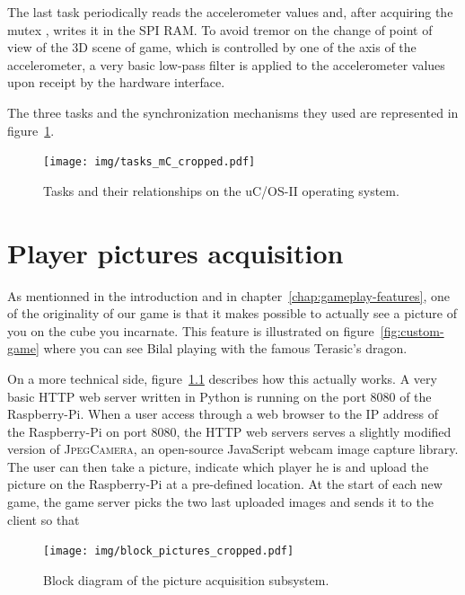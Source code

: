\documentclass[english, DIV=13]{scrreprt}
\begin{document}
The last task periodically reads the accelerometer values and, after acquiring
the mutex , writes it in the SPI RAM. To avoid tremor on the change of point of
view of the 3D scene of game, which is controlled by one of the axis of the
accelerometer, a very basic low-pass filter is applied to the accelerometer
values upon receipt by the hardware interface.

The three tasks and the synchronization mechanisms they used are represented in
figure~\ref{fig:tasks-mc}.

\begin{figure}[bth]
    \centering
    \texttt{[image: img/tasks\_mC\_cropped.pdf]}
    \caption{Tasks and their relationships on the uC/OS-II operating system.}
    \label{fig:tasks-mc}
\end{figure}


\chapter{Player pictures acquisition}
\label{chap:pic-acq}

As mentionned in the introduction and in chapter~\ref{chap:gameplay-features},
one of the originality of our game is that it makes possible to actually see
a picture of you on the cube you incarnate. This feature is illustrated on
figure~\ref{fig:custom-game} where you can see Bilal playing with the famous
Terasic's dragon.

On a more technical side, figure~\ref{fig:pic-acq} describes how this actually
works. A very basic HTTP web server written in Python is running on the port 8080
of the Raspberry-Pi. When a user access through a web browser to the IP address
of the Raspberry-Pi on port 8080, the HTTP web servers serves a slightly modified
version of \textsc{JpegCamera}, an open-source JavaScript webcam image capture
library. The user can then take a picture, indicate which player he is and upload
the picture on the Raspberry-Pi at a pre-defined location. At the start of each new game,
the game server picks the two last uploaded images and sends it to the client so that

\begin{figure}[bth]
    \centering
    \texttt{[image: img/block\_pictures\_cropped.pdf]}
    \caption{Block diagram of the picture acquisition subsystem.}
    \label{fig:pic-acq}
\end{figure}
\end{document}
